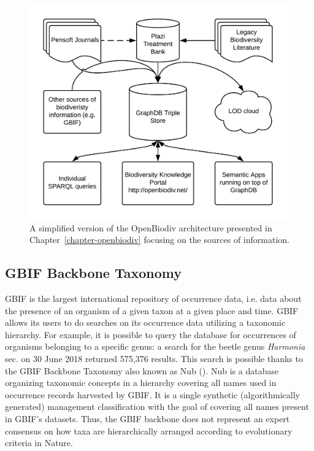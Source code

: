 \begin{figure}
\centering
\includegraphics[width=\textwidth]{Figures/openbiodiv-sources-simple}
\decoRule
\caption{A simplified version of the OpenBiodiv architecture presented in Chapter~\ref{chapter-openbiodiv} focusing on the sources of information.}
\label{fig:openbiodiv-sources-simple}
\end{figure}


\subsection{GBIF Backbone Taxonomy}

GBIF is the largest international repository of occurrence data, i.e. data about the presence of an organism of a given taxon at a given place and time. GBIF allows its users to do searches on its occurrence data utilizing a taxonomic hierarchy. For example, it is possible to query the database  for occurrences of organisms belonging to a specific genus: a search for the beetle genus \textit{Harmonia} sec. \cite{gbif_secretariat_gbif_2017} on 30 June 2018 returned 575,376 results. This search is possible thanks to the GBIF Backbone Taxonomy also known as Nub (\cite{gbif_secretariat_gbif_2017}). Nub is a database organizing taxonomic concepts in a hierarchy covering all names used in occurrence records harvested by GBIF.  It is a single synthetic (algorithmically generated) management classification with the goal of covering all names present in GBIF's datasets. Thus, the GBIF backbone does not represent an expert consensus on how taxa are hierarchically arranged according to evolutionary criteria in Nature.

